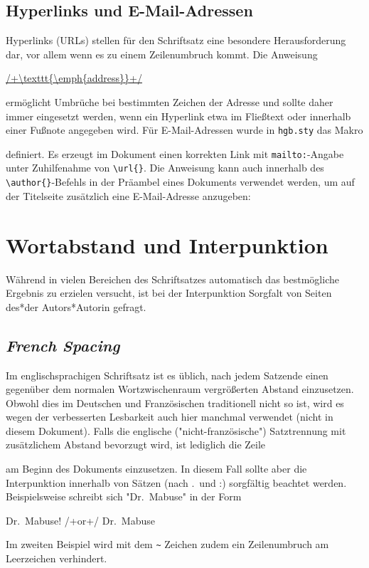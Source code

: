 \subsection{Hyperlinks und E-Mail-Adressen}

Hyperlinks (URLs) stellen für den Schriftsatz eine besondere Herausforderung
dar, vor allem wenn es zu einem Zeilenumbruch kommt. Die Anweisung
%
\begin{LaTeXCode}[numbers=none]
\url{/+\texttt{\emph{address}}+/}
\end{LaTeXCode}
%
ermöglicht Umbrüche bei bestimmten Zeichen der Adresse und sollte daher immer
eingesetzt werden, wenn ein Hyperlink etwa im Fließtext oder innerhalb einer
Fußnote angegeben wird.
%
Für E-Mail-Adressen wurde in \texttt{hgb.sty} das Makro
%
\begin{LaTeXCode}[numbers=none]
\end{LaTeXCode}
%
definiert. Es erzeugt im Dokument einen korrekten Link mit
\texttt{mailto:}-Angabe unter Zuhilfenahme von \verb|\url{}|. Die Anweisung
kann auch innerhalb des \verb|\author{}|-Befehls in der Präambel eines
Dokuments verwendet werden, um auf der Titelseite zusätzlich eine
E-Mail-Adresse anzugeben:
%
\begin{LaTeXCode}[numbers=none]
\author{%
    Alex A. Wiseguy \\%
}
\end{LaTeXCode}


\section{Wortabstand und Interpunktion}

Während \latex in vielen Bereichen des Schriftsatzes automatisch das
bestmögliche Ergebnis zu erzielen versucht, ist bei der Interpunktion
Sorgfalt von Seiten des*der Autors*Autorin gefragt.

\subsection{\emph{French Spacing}}

Im englischsprachigen Schriftsatz ist es üblich, nach jedem Satzende einen
gegenüber dem normalen Wortzwischenraum vergrößerten Abstand einzusetzen.
Obwohl dies im Deutschen und Französischen traditionell nicht so ist, wird es
wegen der verbesserten Lesbarkeit auch hier manchmal verwendet (nicht in
diesem Dokument). Falls die englische ("nicht-französische") Satztrennung mit
zusätzlichem Abstand bevorzugt wird, ist lediglich die Zeile
%
\begin{LaTeXCode}[numbers=none]
\nonfrenchspacing
\end{LaTeXCode}
%
am Beginn des Dokuments einzusetzen. In diesem Fall sollte aber die
Interpunktion innerhalb von Sätzen (nach .\ und :) sorgfältig beachtet werden.
Beispielsweise schreibt sich "Dr.\ Mabuse" in der Form
%
\begin{LaTeXCode}[numbers=none]
Dr.\ Mabuse! /+\quad\textrm{or}\quad+/ Dr.~Mabuse
\end{LaTeXCode}
%
Im zweiten Beispiel wird mit dem \verb!~! Zeichen zudem ein Zeilenumbruch am
Leerzeichen verhindert.

